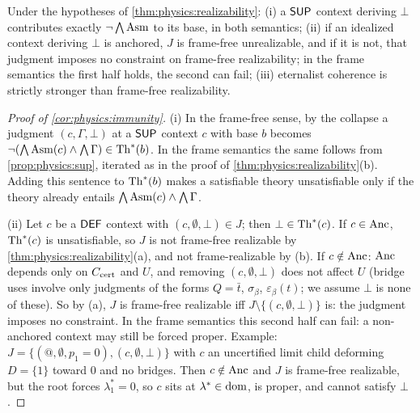 \begin{corollary}\label{cor:physics:immunity}
Under the hypotheses of \cref{thm:physics:realizability}: (i) a $\mathsf{SUP}$ context deriving
$\bot$ contributes exactly $\neg\bigwedge\mathrm{Asm}$ to its base, in both semantics; (ii) if an
idealized context deriving $\bot$ is anchored, $J$ is frame-free unrealizable, and if it is
not, that judgment imposes no constraint on frame-free realizability; in the frame semantics
the first half holds, the second can fail; (iii) eternalist coherence is strictly stronger
than frame-free realizability.
\end{corollary}
\begin{proof}[Proof of \cref{cor:physics:immunity}]
(i) In the frame-free sense, by the collapse a judgment $(c,\Gamma,\bot)$ at a $\mathsf{SUP}$
context $c$ with base $b$ becomes $\neg(\bigwedge\mathrm{Asm}(c)\wedge\bigwedge\Gamma)\in\mathrm{Th}^*(b)$.
In the frame semantics the same follows from \cref{prop:physics:sup}, iterated as in the
proof of \cref{thm:physics:realizability}(b). Adding this sentence to $\mathrm{Th}^*(b)$ makes a
satisfiable theory unsatisfiable only if the theory already entails
$\bigwedge\mathrm{Asm}(c)\wedge\bigwedge\Gamma$.

(ii) Let $c$ be a $\mathsf{DEF}$ context with $(c,\emptyset,\bot)\in J$; then $\bot\in\mathrm{Th}^*(c)$. If
$c\in\mathrm{Anc}$, $\mathrm{Th}^*(c)$ is unsatisfiable, so $J$ is not frame-free realizable by
\cref{thm:physics:realizability}(a), and not frame-realizable by (b). If $c\notin\mathrm{Anc}$:
$\mathrm{Anc}$ depends only on $C_{\mathrm{cert}}$ and $U$, and removing $(c,\emptyset,\bot)$ does not affect $U$
(bridge uses involve only judgments of the forms $Q=\bar t$, $\sigma_\beta$,
$\varepsilon_\beta(t)$; we assume $\bot$ is none of these). So by (a), $J$ is frame-free
realizable iff $J\setminus\{(c,\emptyset,\bot)\}$ is: the judgment imposes no constraint. In
the frame semantics this second half can fail: a non-anchored context may still be forced
proper. Example: $J=\{(@,\emptyset,p_1=0),
(c,\emptyset,\bot)\}$ with $c$ an uncertified limit child deforming $D=\{1\}$ toward $0$ and
no bridges. Then $c\notin\mathrm{Anc}$ and $J$ is frame-free realizable, but the root forces
$\lambda^*_1=0$, so $c$ sits at $\lambda^*\in\operatorname{dom}$, is proper, and cannot satisfy $\bot$.


\end{proof}
